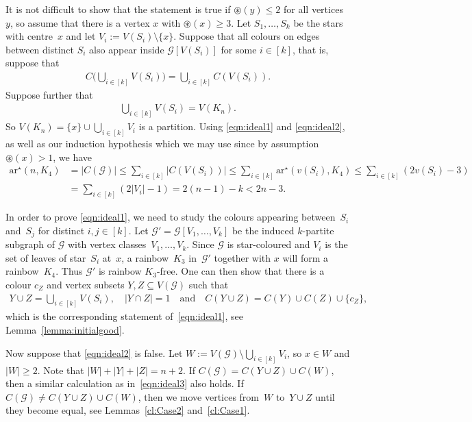 \documentclass[a4paper, 12pt]{article}
\numberwithin{equation}{section}
\def\sar{{\mathrm{ar}^{\star}}}
\def\cen{\circledast}
\newcommand{\ms}[1]{\mathscr{#1}}
\begin{document}
It is not difficult to show that the statement is true if $\cen(y) \leq 2$ for all vertices $y$, so assume that there is a vertex $x$ with $\cen(x) \geq 3$. 
Let $S_1, \dots, S_k$ be the stars with centre~$x$
and let $V_i := V(S_i)\setminus \{x\}$.
Suppose that all colours 
on edges between distinct $S_i$ 
also 
appear inside $\ms{G}[V(S_i)]$ for some $i \in [k]$, that is, suppose that
\begin{align}
	C\Big(\bigcup_{i \in [k]}V(S_i)\Big) = \bigcup_{i \in [k]} C(V(S_i)). \label{eqn:ideal1}
\end{align}
Suppose further that 
\begin{align}
	\bigcup_{i \in [k]} V(S_i) = V(K_n). %
    \label{eqn:ideal2}
\end{align}
So 
$ V(K_n) %
= \{x\} \cup \bigcup_{i \in [k]}V_i$ is a partition.
Using \eqref{eqn:ideal1} and \eqref{eqn:ideal2}, as well as our induction hypothesis which we may use since by assumption $\cen(x) >1$, we have
\begin{align}
	\sar(n,K_4)  &= | C (\ms{G} )| 
	\le \sum_{i \in [k]} |C(V(S_i))|
	\le \sum_{i \in [k]} \sar( v(S_i), K_4)  
 \le \sum_{i \in [k]}(2v(S_i)-3)
	\nonumber
	\\ 
	&= \sum_{i \in [k]}(2|V_i|-1)
	= 2(n-1) -k 
    < 2n-3
	. \label{eqn:ideal3}
\end{align}

In order to prove \eqref{eqn:ideal1}, we need to study the colours appearing between~$S_i$ and~$S_j$ for distinct $i,j \in [k]$.
Let $\ms{G'} = \ms{G}[V_1, \dots, V_k]$ be the induced $k$-partite subgraph of $\ms{G}$ with vertex classes~$V_1, \dots, V_k$. 
Since $\ms{G}$ is star-coloured and $V_i$ is the set of leaves of star~$S_i$ at~$x$, a rainbow~$K_3$ in~$\ms{G'}$ together with $x$ will form a rainbow~$K_4$.
Thus $\ms{G'}$ is rainbow $K_3$-free. 
One can then show that there is a colour $c_Z$ and vertex subsets $Y, Z \subseteq V(\ms{G})$ such that 
\begin{align*}
	Y \cup Z = \bigcup_{i \in [k]} V(S_i),
	\quad
    | Y \cap Z| = 1
    \quad\text{and}\quad
	C(Y \cup Z) = C(Y) \cup C(Z) \cup \{c_Z\},
\end{align*}
which is the corresponding statement of~\eqref{eqn:ideal1}, see Lemma~\ref{lemma:initialgood}.

Now suppose that \eqref{eqn:ideal2} is false.
Let $W := V(\ms{G}) \setminus \bigcup_{i \in [k]} V_i$, so $x \in W$ and $|W| \ge 2$.
Note that $|W| + |Y|+|Z| = n+2$. 
If $C(\ms{G}) = C(Y \cup Z) \cup C(W)$, then a similar calculation as in~\eqref{eqn:ideal3} also holds.
If $C(\ms{G}) \ne C(Y \cup Z) \cup C(W)$, then we move vertices from~$W$ to~$Y \cup Z$ until they become equal, see Lemmas~\ref{cl:Case2} and~\ref{cl:Case1}.
\end{document}
